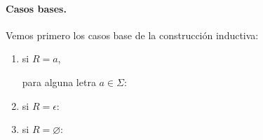 \paragraph{Casos bases.} Vemos primero los casos base de la construcción inductiva:
\begin{multicols}{3}
    \begin{enumerate}
        \item si $R = a$,

              para alguna letra $a \in \Sigma$:

        \item si $R = \epsilon$:

        \item si $R = \varnothing$:
    \end{enumerate}
\end{multicols}
